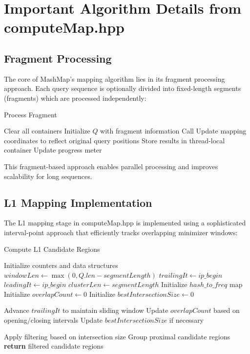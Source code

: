 \documentclass{article}
\begin{document}
\section{Important Algorithm Details from computeMap.hpp}

\subsection{Fragment Processing}

The core of MashMap's mapping algorithm lies in its fragment processing approach. Each query sequence is optionally divided into fixed-length segments (fragments) which are processed independently:

\begin{algorithm}
\caption{Process Fragment}
\begin{algorithmic}[1]
\State Clear all containers
\State Initialize $Q$ with fragment information
\State Call 
\State Update mapping coordinates to reflect original query positions
\State Store results in thread-local container
\State Update progress meter
\EndProcedure
\end{algorithmic}
\end{algorithm}

This fragment-based approach enables parallel processing and improves scalability for long sequences.

\subsection{L1 Mapping Implementation}

The L1 mapping stage in computeMap.hpp is implemented using a sophisticated interval-point approach that efficiently tracks overlapping minimizer windows:

\begin{algorithm}
\caption{Compute L1 Candidate Regions}
\begin{algorithmic}[1]
\State Initialize counters and data structures
\State $windowLen \gets \max(0, Q.len - segmentLength)$
\State $trailingIt \gets ip\_begin$
\State $leadingIt \gets ip\_begin$
\State $clusterLen \gets segmentLength$
\State Initialize $hash\_to\_freq$ map
\State Initialize $overlapCount \gets 0$
\State Initialize $bestIntersectionSize \gets 0$

    \State Advance $trailingIt$ to maintain sliding window
    \State Update $overlapCount$ based on opening/closing intervals
    \State Update $bestIntersectionSize$ if necessary
\EndWhile

\State Apply filtering based on intersection size
\State Group proximal candidate regions
\State \textbf{return} filtered candidate regions
\EndProcedure
\end{algorithmic}
\end{algorithm}
\end{document}
